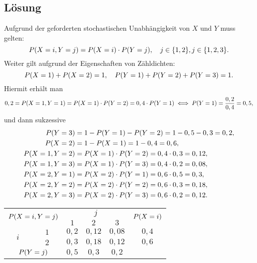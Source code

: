\documentclass{exercise}
\begin{document}
    \subsection*{Lösung}
    Aufgrund der geforderten stochastischen Unabhängigkeit von \(X\) und \(Y\) muss gelten:
    \[
        P\parentheses*{X = i, Y = j} = P\parentheses*{X = i} \cdot P\parentheses*{Y = j}, \quad j \in \braces*{1, 2}, j \in \braces*{1, 2, 3}.
    \]
    Weiter gilt aufgrund der Eigenschaften von Zähldichten:
    \[
        P\parentheses*{X = 1} + P\parentheses*{X = 2} = 1, \quad P\parentheses*{Y = 1} + P\parentheses*{Y = 2} + P\parentheses*{Y = 3} = 1.
    \]
    Hiermit erhält man
    \[
        0,2 = P\parentheses*{X = 1, Y = 1} = P\parentheses*{X = 1} \cdot P\parentheses*{Y = 2} = 0,4 \cdot P\parentheses*{Y = 1} \iff P\parentheses*{Y = 1} = \frac{0,2}{0,4} = 0,5,
    \]
    und dann sukzessive
    \begin{align*}
        P\parentheses*{Y = 3} &= 1 - P\parentheses*{Y = 1} - P\parentheses*{Y = 2} = 1 - 0,5 - 0,3 = 0,2,\\
        P\parentheses*{X = 2} &= 1 - P\parentheses*{X = 1} = 1 - 0,4 = 0,6,\\
        P\parentheses*{X = 1, Y = 2} &= P\parentheses*{X = 1} \cdot P\parentheses*{Y = 2} = 0,4 \cdot 0,3 = 0,12,\\
        P\parentheses*{X = 1, Y = 3} &= P\parentheses*{X = 1} \cdot P\parentheses*{Y = 3} = 0,4 \cdot 0,2 = 0,08,\\
        P\parentheses*{X = 2, Y = 1} &= P\parentheses*{X = 2} \cdot P\parentheses*{Y = 1} = 0,6 \cdot 0,5 = 0,3,\\
        P\parentheses*{X = 2, Y = 2} &= P\parentheses*{X = 2} \cdot P\parentheses*{Y = 2} = 0,6 \cdot 0,3 = 0,18,\\
        P\parentheses*{X = 2, Y = 3} &= P\parentheses*{X = 2} \cdot P\parentheses*{Y = 3} = 0,6 \cdot 0,2 = 0,12.
    \end{align*}
    \begin{center}
        \begin{tabular}{cc|ccc|c}
            \toprule
            \multicolumn{2}{c|}{\multirow{2}{*}{\(P\parentheses*{X = i, Y = j}\)}} & \multicolumn{3}{c|}{\(j\)} & \multirow{2}{*}{\(P\parentheses*{X = i}\)}\\
            \multicolumn{2}{c|}{} & \(1\) & \(2\) & \(3\) &\\
            \midrule
            \multirow{2}{*}{\(i\)} & \(1\) & \(0,2\) & \(0,12\) & \(0,08\) & \(0,4\)\\
            & \(2\) & \(0,3\) & \(0,18\) & \(0,12\) & \(0,6\)\\
            \midrule
            \multicolumn{2}{c|}{\(P\parentheses*{Y = j}\)} & \(0,5\) & \(0,3\) & \(0,2\) &\\
            \bottomrule
        \end{tabular}
    \end{center}
        
\end{document}
